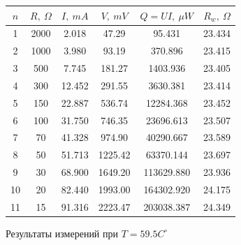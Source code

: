 \documentclass[a4paper,12pt]{report}
\begin{document}
    \begin{figure}[H]
        \centering
        \begin{tabular}{|c|c|c|c|c|c|}
            \hline
            $n$ & $R,\ \Omega$ & $I, \ mA$ & $V,\ mV$ & $Q=UI,\ \mu W$ & $R_{w}, \ \Omega$ \\
            \hline
            1 & 2000 & 2.018 & 47.29 & 95.431 & 23.434 \\
            \hline
            2 & 1000 & 3.980 & 93.19 & 370.896 & 23.415 \\
            \hline
            3 & 500 & 7.745 & 181.27 & 1403.936 & 23.405 \\
            \hline
            4 & 300 & 12.452 & 291.55 & 3630.381 & 23.414 \\
            \hline
            5 & 150 & 22.887 & 536.74 & 12284.368 & 23.452 \\
            \hline
            6 & 100 & 31.750 & 746.35 & 23696.613 & 23.507 \\
            \hline
            7 & 70 & 41.328 & 974.90 & 40290.667 & 23.589 \\
            \hline
            8 & 50 & 51.713 & 1225.42 & 63370.144 & 23.697 \\
            \hline
            9 & 30 & 68.900 & 1649.20 & 113629.880 & 23.936 \\
            \hline
            10 & 20 & 82.440 & 1993.00 & 164302.920 & 24.175 \\
            \hline
            11 & 15 & 91.316 & 2223.47 & 203038.387 & 24.349 \\
            \hline
        \end{tabular}
        \caption{Результаты измерений при $T=59.5C^\circ$}
    \end{figure}
\end{document}
